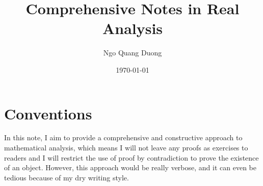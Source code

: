 \documentclass{real-analysis}
\title{Comprehensive Notes in Real Analysis}
\author{Ngo Quang Duong}
\date{\today}
\begin{document}
\maketitle

\tableofcontents

\chapter*{Conventions}

In this note, I aim to provide a comprehensive and constructive approach to mathematical analysis, which means I will not leave any proofs as exercises to readers and I will restrict the use of proof by contradiction to prove the existence of an object. However, this approach would be really verbose, and it can even be tedious because of my dry writing style.






\end{document}
